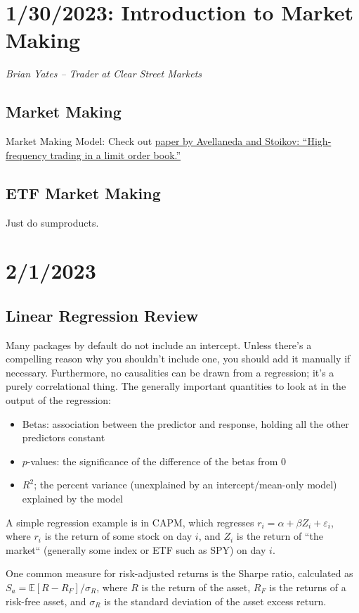 \documentclass[12pt]{report}
\begin{document}
\chapter{1/30/2023: Introduction to Market Making}
\textit{Brian Yates -- Trader at Clear Street Markets}

\section{Market Making}
Market Making Model: Check out \href{https://www.math.nyu.edu/~avellane/HighFrequencyTrading.pdf}{paper by Avellaneda and Stoikov: ``High-frequency trading in a limit order book.''}

\section{ETF Market Making}
Just do sumproducts.

\chapter{2/1/2023}
\section{Linear Regression Review}
Many packages by default do not include an intercept. Unless there's a compelling reason why you shouldn't include one, you should add it manually if necessary. Furthermore, no causalities can be drawn from a regression; it's a purely correlational thing. The generally important quantities to look at in the output of the regression: \begin{itemize}
	\item Betas: association between the predictor and response, holding all the other predictors constant
	\item $p$-values: the significance of the difference of the betas from 0
	\item $R^2$; the percent variance (unexplained by an intercept/mean-only model) explained by the model
\end{itemize} A simple regression example is in CAPM, which regresses $r_i=\alpha+\beta Z_i+\varepsilon_i$, where $r_i$ is the return of some stock on day $i$, and $Z_i$ is the return of ``the market`` (generally some index or ETF such as SPY) on day $i$.

One common measure for risk-adjusted returns is the Sharpe ratio, calculated as $S_a=\mathbb E[R-R_F]/\sigma_R$, where $R$ is the return of the asset, $R_F$ is the returns of a risk-free asset, and $\sigma_R$ is the standard deviation of the asset excess return.
\end{document}
